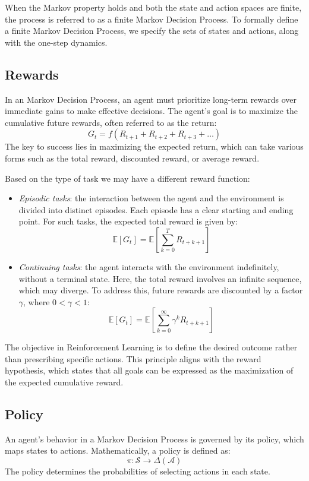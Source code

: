 When the Markov property holds and both the state and action spaces are finite, the process is referred to as a finite Markov Decision Process.
To formally define a finite Markov Decision Process, we specify the sets of states and actions, along with the one-step dynamics. 

\subsection{Rewards}
In an Markov Decision Process, an agent must prioritize long-term rewards over immediate gains to make effective decisions.
The agent's goal is to maximize the cumulative future rewards, often referred to as the return: 
\[G_t=f(R_{t+1}+R_{t+2}+R_{t+3}+\dots)\]
The key to success lies in maximizing the expected return, which can take various forms such as the total reward, discounted reward, or average reward.

Based on the type of task we may have a different reward function: 
\begin{itemize}
    \item \textit{Episodic tasks}: the interaction between the agent and the environment is divided into distinct episodes. 
        Each episode has a clear starting and ending point. 
        For such tasks, the expected total reward is given by:
        \[\mathbb{E}\left[G_t\right]=\mathbb{E}\left[\sum_{k=0}^{T}R_{t+k+1}\right]\]
    \item \textit{Continuing tasks}: the agent interacts with the environment indefinitely, without a terminal state. 
        Here, the total reward involves an infinite sequence, which may diverge. 
        To address this, future rewards are discounted by a factor $\gamma$, where $0<\gamma<1$: 
        \[\mathbb{E}\left[G_t\right]=\mathbb{E}\left[\sum_{k=0}^{\infty}\gamma^kR_{t+k+1}\right]\]
\end{itemize}
The objective in Reinforcement Learning is to define the desired outcome rather than prescribing specific actions. 
This principle aligns with the reward hypothesis, which states that all goals can be expressed as the maximization of the expected cumulative reward.

\subsection{Policy}
An agent's behavior in a Markov Decision Process is governed by its policy, which maps states to actions. 
Mathematically, a policy is defined as:
\[\pi:\mathcal{S}\rightarrow\Delta(\mathcal{A})\]
\noindent  The policy determines the probabilities of selecting actions in each state.

